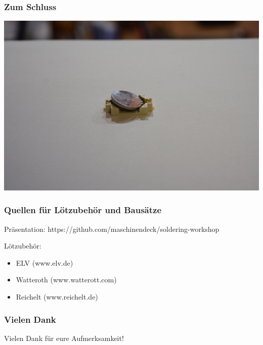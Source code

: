 \documentclass[10pt]{beamer}
\begin{document}
	\begin{frame}
		\frametitle{Zum Schluss}
		\includegraphics[width=\linewidth]{images/badge18/battHolderWithBattery.JPG}
	\end{frame}

	\begin{frame}
		\frametitle{Quellen für Lötzubehör und Bausätze}
		\large Präsentation: https://github.com/maschinendeck/soldering-workshop
		
		\vspace{5mm}
		
		Lötzubehör:
		\begin{itemize}
			\item{ELV (www.elv.de)}
			\item{Watteroth (www.watterott.com)}
			\item{Reichelt (www.reichelt.de)}
		\end{itemize}
	\end{frame}

	\begin{frame}
	\frametitle{Vielen Dank}
	\centering
	{\LARGE Vielen Dank für eure Aufmerksamkeit!}
	
	\end{frame}
    
\end{document}
